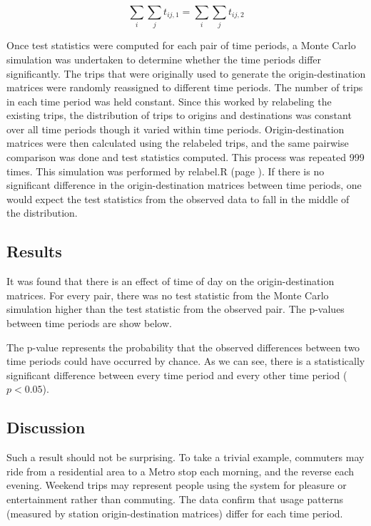 \documentclass[letterpaper,11pt]{article}
\newcommand{\reflst}[1]{#1 (page \pageref{#1})}
\begin{document}
\begin{equation}\label{eq:timeconstraint}
  \displaystyle \sum_i \sum_j t_{ij,1} = \sum_i \sum_j t_{ij,2}
\end{equation}

Once test statistics were computed for each pair of time periods, a
Monte Carlo simulation was undertaken to determine whether the time
periods differ significantly. The trips that were originally used to
generate the origin-destination matrices were randomly reassigned to different
time periods. The number of trips in each time period was held
constant. Since this worked by relabeling the existing trips, the
distribution of trips to origins and destinations was constant over
all time periods though it varied within time
periods. Origin-destination matrices were then calculated using the
relabeled trips, and the same pairwise comparison was done and test
statistics computed. This process was repeated 999 times. This
simulation was performed by \reflst{relabel.R}. If there is no
significant difference in the origin-destination matrices between time
periods, one would expect the test statistics from the observed data
to fall in the middle of the distribution. 

\subsection{Results}

It was found that there is an effect of time of day on the
origin-destination matrices. For every pair, there was no test
statistic from the Monte Carlo simulation higher than the test statistic
from the observed pair. The p-values between time periods are show below.

\noindent 

The p-value represents the probability that the observed differences
between two time periods could have occurred by chance. As we can see,
there is a statistically significant difference between every time
period and every other time period ($p < 0.05$).

\subsection{Discussion}

Such a result should not be surprising. To take a trivial example,
commuters may ride from a residential area to a Metro stop each
morning, and the reverse each evening. Weekend trips may represent
people using the system for pleasure or entertainment rather than
commuting. The data confirm that usage patterns (measured by station
origin-destination matrices) differ for each time period.
\end{document}
